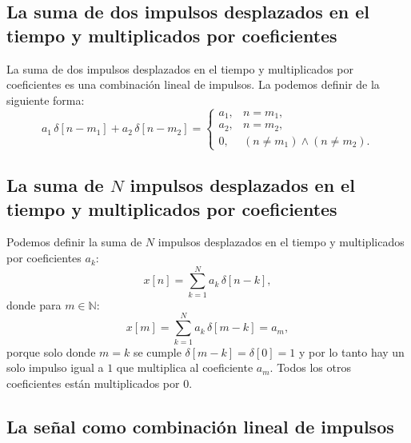 \documentclass[11pt,a4paper,openany]{book}
\begin{document}
\subsection{La suma de dos impulsos desplazados en el tiempo y multiplicados por coeficientes}

La suma de dos impulsos desplazados en el tiempo y multiplicados por
coeficientes es una combinación lineal de impulsos. La podemos
definir de la siguiente forma:
\begin{equation}
	a_{1} \, \delta[n - m_{1}] + a_{2} \, \delta[n - m_{2}] = 
	\begin{cases}
		a_{1}, & n = m_{1}, \\
		a_{2}, & n = m_{2}, \\
		0, & (n \neq m_{1}) \wedge (n \neq m_{2}).
	\end{cases}
\end{equation}

\subsection{La suma de $N$ impulsos desplazados en el tiempo y multiplicados por coeficientes}

Podemos definir la suma de $N$ impulsos desplazados en el tiempo y multiplicados por
coeficientes $a_{k}$:
\begin{equation}
	x[n] = \sum_{k = 1}^{N} a_{k} \, \delta[n - k],
\end{equation}
donde para $m \in \mathbb{N}$:
\begin{equation}
	x[m] = \sum_{k = 1}^{N} a_{k} \, \delta[m - k] = a_{m},
\end{equation}
porque solo donde $m = k$ se cumple $\delta[m - k] = \delta[0] = 1$ y por lo tanto hay un solo impulso igual a $1$ que multiplica al coeficiente $a_{m}$. Todos los otros coeficientes están multiplicados por $0$.

\subsection{La señal como combinación lineal de impulsos}
\end{document}
